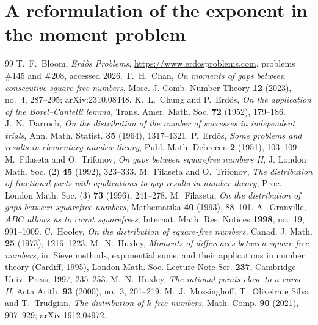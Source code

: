 \documentclass[10pt,a4paper]{amsart}
\numberwithin{equation}{section}
\begin{document}
\appendix

\section{A reformulation of the exponent in the moment problem}\label{app:moment}


\begin{thebibliography}{99}
 T.~F.~Bloom, \emph{Erd\H{o}s Problems}, \url{https://www.erdosproblems.com}, problems \#145 and \#208, accessed 2026.
 T.~H.~Chan, \emph{On moments of gaps between consecutive square-free numbers}, Mosc. J. Comb. Number Theory \textbf{12} (2023), no.~4, 287--295; arXiv:2310.08448.
 K.~L.~Chung and P.~Erd\H{o}s, \emph{On the application of the Borel--Cantelli lemma}, Trans. Amer. Math. Soc. \textbf{72} (1952), 179--186.
 J.~N.~Darroch, \emph{On the distribution of the number of successes in independent trials}, Ann. Math. Statist. \textbf{35} (1964), 1317--1321.
 P.~Erd\H{o}s, \emph{Some problems and results in elementary number theory}, Publ. Math. Debrecen \textbf{2} (1951), 103--109.
 M.~Filaseta and O.~Trifonov, \emph{On gaps between squarefree numbers II}, J. London Math. Soc. (2) \textbf{45} (1992), 323--333.
 M.~Filaseta and O.~Trifonov, \emph{The distribution of fractional parts with applications to gap results in number theory}, Proc. London Math. Soc. (3) \textbf{73} (1996), 241--278.
 M.~Filaseta, \emph{On the distribution of gaps between squarefree numbers}, Mathematika \textbf{40} (1993), 88--101.
 A.~Granville, \emph{$ABC$ allows us to count squarefrees}, Internat. Math. Res. Notices \textbf{1998}, no.~19, 991--1009.
 C.~Hooley, \emph{On the distribution of square-free numbers}, Canad. J. Math. \textbf{25} (1973), 1216--1223.
 M.~N.~Huxley, \emph{Moments of differences between square-free numbers}, in: Sieve methods, exponential sums, and their applications in number theory (Cardiff, 1995), London Math. Soc. Lecture Note Ser. \textbf{237}, Cambridge Univ. Press, 1997, 235--253.
 M.~N.~Huxley, \emph{The rational points close to a curve II}, Acta Arith. \textbf{93} (2000), no.~3, 201--219.
 M.~J.~Mossinghoff, T.~Oliveira e Silva and T.~Trudgian, \emph{The distribution of $k$-free numbers}, Math. Comp. \textbf{90} (2021), 907--929; arXiv:1912.04972.

\end{thebibliography}
\end{document}
